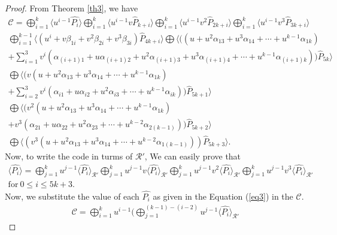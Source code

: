 \documentclass{amsart}
\theoremstyle{definition}
\theoremstyle{remark}
\numberwithin{equation}{section}
\begin{document}
 \begin{proof}
		From Theorem \ref{th3}, we have
  \allowdisplaybreaks
  \begin{gather*}
		\mathcal{C}= \bigoplus_{i=1}^{k}\langle u^{i-1}\hat{P_{i}}\rangle \bigoplus_{i=1}^{k}\langle u^{i-1}v\hat{P}_{k+i}\rangle \bigoplus_{i=1}^{k}\langle u^{i-1}v^2\hat{P}_{2k+i}\rangle  \bigoplus_{i=1}^{k}\langle u^{i-1}v^3\hat{P}_{3k+i}\rangle \\
        \bigoplus_{i=1}^{k-1} \langle (u^i+ v\beta_{1i} + v^2\beta_{2i} + v^3\beta_{3i})\hat{P}_{4k+i}\rangle   \bigoplus \langle ((u + u^2\alpha_{13} + u^3\alpha_{14} + \cdots + u^{k-1}\alpha_{1k}) \\
      + \sum_{i=1}^{3} v^i( \alpha_{(i+1)1} + u\alpha_{(i+1)2} + u^2\alpha_{(i+1)3} + u^3\alpha_{(i+1)4} + \cdots + u^{k-1}\alpha_{(i+1)k} ))\hat{P}_{5k}\rangle
     \\  \bigoplus  \langle (v(u + u^2\alpha_{13} + u^3\alpha_{14} + \cdots + u^{k-1}\alpha_{1k})  \\+ \sum_{i=2}^{3} v^i( \alpha_{i1} + u\alpha_{i2} + u^2\alpha_{i3} + \cdots + u^{k-1}\alpha_{ik} ))\hat{P}_{5k+1} \rangle
     \\  \bigoplus  \langle (v^2(u + u^2\alpha_{13} + u^3\alpha_{14} + \cdots + u^{k-1}\alpha_{1k})
     \\+ v^3( \alpha_{21} + u\alpha_{22} + u^2\alpha_{23} + \cdots + u^{k-2}\alpha_{2(k-1)}))\hat{P}_{5k+2}\rangle
     \\  \bigoplus \langle (v^3(u + u^2\alpha_{13} + u^3\alpha_{14} + \cdots + u^{k-2}\alpha_{1(k-1)}))\hat{P}_{5k+3}\rangle. 
		\end{gather*}
        {Now, to write the code in turms of $\mathcal{R}'$, We can easily prove that}
 \allowdisplaybreaks
  \begin{gather} \label{eq3}
		\langle \hat{P_i} \rangle =  \bigoplus_{j=1}^{k}  u^{j-1}\langle \hat{P_i} \rangle_{\mathcal{R}'}
      \bigoplus_{j=1}^{k}  u^{j-1}v\langle \hat{P_i} \rangle_{\mathcal{R}'}
      \bigoplus_{j=1}^{k}  u^{j-1}v^2\langle \hat{P_i} \rangle_{\mathcal{R}'}
      \bigoplus_{j=1}^{k}  u^{j-1}v^3\langle \hat{P_i} \rangle_{\mathcal{R}'} \nonumber\\
      \text{for} ~0 \leq i \leq 5k+3.
		\end{gather}
        {Now, we substitute the value of each $\hat{P_i}$ as given in the Equation (\ref{eq3}) in the $\mathcal{C}$. } 
   \allowdisplaybreaks
  \begin{gather*}
		\mathcal{C}= \bigoplus_{i=1}^{k} u^{i-1} ( \bigoplus_{j=1}^{(k-1)-(i-2)}  u^{j-1}\langle \hat{P_i} \rangle_{\mathcal{R}'}

\end{gather*}
\end{proof}
\end{document}
